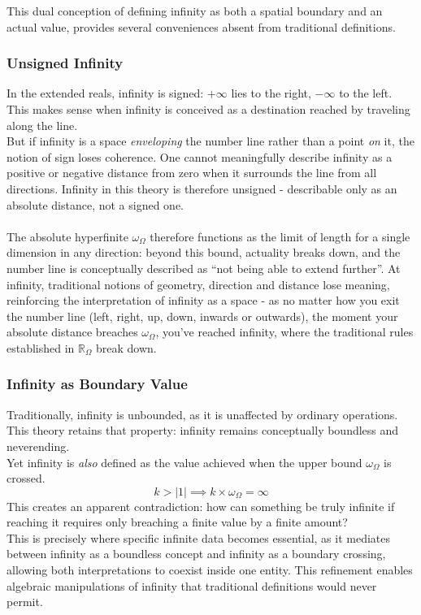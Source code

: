 \documentclass{article}
\begin{document}
This dual conception of defining infinity as both a spatial boundary and an actual value, provides several conveniences absent from traditional definitions. 

\subsubsection{Unsigned Infinity}

In the extended reals, infinity is signed: $+\infty$ lies to the right, $-\infty$ to the left. This makes sense when infinity is conceived as a destination reached by traveling along the line.
\\But if infinity is a space \textit{enveloping} the number line rather than a point \textit{on} it, the notion of sign loses coherence. One cannot meaningfully describe infinity as a positive or negative distance from zero when it surrounds the line from all directions. Infinity in this theory is therefore unsigned - describable only as an absolute distance, not a signed one.
\\\\The absolute hyperfinite $\omega_\Omega$ therefore functions as the limit of length for a single dimension in any direction: beyond this bound, actuality breaks down, and the number line is conceptually described as ``not being able to extend further''. At infinity, traditional notions of geometry, direction and distance lose meaning, reinforcing the interpretation of infinity as a space - as no matter how you exit the number line (left, right, up, down, inwards or outwards), the moment your absolute distance breaches $\omega_\Omega$, you've reached infinity, where the traditional rules established in $\mathbb{R}_\Omega$ break down.

\subsubsection{Infinity as Boundary Value}

Traditionally, infinity is unbounded, as it is unaffected by ordinary operations. This theory retains that property: infinity remains conceptually boundless and neverending.
\\Yet infinity is \textit{also} defined as the value achieved when the upper bound $\omega_\Omega$ is crossed. $$k > |1| \implies k \times \omega_\Omega = \infty$$This creates an apparent contradiction: how can something be truly infinite if reaching it requires only breaching a finite value by a finite amount?
\\This is precisely where specific infinite data becomes essential, as it mediates 
between infinity as a boundless concept and infinity as a boundary crossing, allowing 
both interpretations to coexist inside one entity. This refinement enables algebraic manipulations of 
infinity that traditional definitions would never permit.
\end{document}
